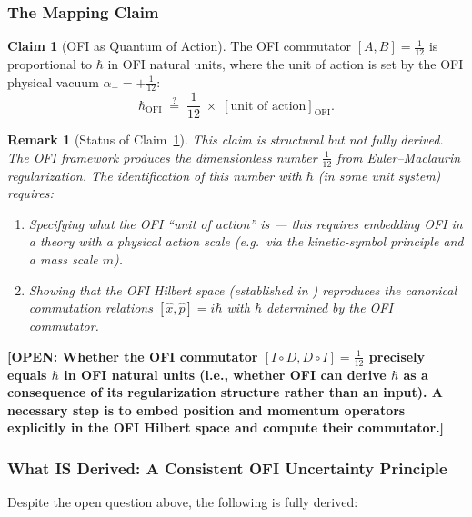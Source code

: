 \documentclass[12pt]{article}
\newtheorem{remark}[theorem]{Remark}
\theoremstyle{definition}
\newtheorem{claim}[theorem]{Claim}
\newcommand{\OFI}{\mathrm{OFI}}
\newcommand{\OPEN}[1]{\textcolor{opencolor}{\textbf{[OPEN: #1]}}}
\begin{document}
\subsubsection{The Mapping Claim}

\begin{claim}[OFI as Quantum of Action]
\label{claim:hbar}
The OFI commutator $[A,B] = \tfrac{1}{12}$ is proportional to
$\hbar$ in OFI natural units, where the unit of action is set by
the OFI physical vacuum $\alpha_+ = +\tfrac{1}{12}$:
\begin{equation}
  \hbar_{\OFI}
  \;\stackrel{?}{=}\;
  \frac{1}{12}
  \;\times\;
  [\text{unit of action}]_{\OFI}.
\end{equation}
\end{claim}

\begin{remark}[Status of Claim~\ref{claim:hbar}]
This claim is \emph{structural} but not fully derived.  The OFI
framework produces the dimensionless number $\tfrac{1}{12}$
from Euler--Maclaurin regularization.  The \emph{identification}
of this number with $\hbar$ (in some unit system) requires:
\begin{enumerate}[label=(\roman*),leftmargin=2em]
\item Specifying what the OFI ``unit of action'' is — this requires
  embedding OFI in a theory with a physical action scale (e.g.\ via the
  kinetic-symbol principle and a mass scale $m$).
\item Showing that the OFI Hilbert space (established in
  \cite{OFI_Hilbert}) reproduces the canonical commutation relations
  $[\hat{x},\hat{p}] = i\hbar$ with $\hbar$ determined by the OFI
  commutator.
\end{enumerate}
\end{remark}

\OPEN{Whether the OFI commutator $[I\circ D, D\circ I] = \tfrac{1}{12}$
precisely equals $\hbar$ in OFI natural units (i.e., whether OFI can
derive $\hbar$ as a consequence of its regularization structure rather
than an input).  A necessary step is to embed position and momentum
operators explicitly in the OFI Hilbert space and compute their
commutator.}

\subsubsection{What IS Derived: A Consistent OFI Uncertainty Principle}

Despite the open question above, the following is fully derived:
\end{document}

